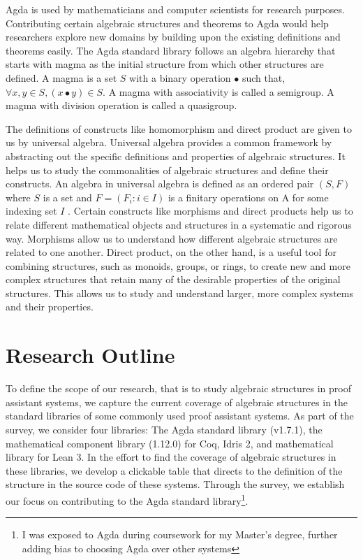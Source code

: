 Agda is used by mathematicians and computer scientists for research purposes.
Contributing certain algebraic structures and theorems to Agda would help
researchers explore new domains by building upon the existing definitions and
theorems easily. The Agda standard library follows an algebra hierarchy that
starts with magma as the initial structure from which other structures are
defined. A magma is a set $S$ with a binary operation $∙$ such that, $\forall
x,y \in S, (x ∙ y) \in S$. A magma with associativity is called a semigroup. A
magma with division operation is called a quasigroup.

The definitions of constructs like homomorphism and direct product are given to
us by universal algebra. Universal algebra provides a common framework by
abstracting out the specific definitions and properties of algebraic structures.
It helps us to study the commonalities of algebraic structures and define their
constructs. An algebra in universal algebra is defined as an ordered pair
$(S,F)$ where $S$ is a set and $F = (F_i:i\in I)$ is a finitary operations on A
for some indexing set $I$ \cite{sannella2012foundations}. Certain constructs
like morphisms and direct products help us to relate different mathematical
objects and structures in a systematic and rigorous way. Morphisms
allow us to understand how different algebraic structures are related to one
another. Direct product, on the other hand, is a useful tool for combining
structures, such as monoids, groups, or rings, to create new and more
complex structures that retain many of the desirable properties of the original
structures. This allows us to study and understand larger, more complex systems
and their properties.

\section{Research Outline}
To define the scope of our research, that is to study algebraic structures in
proof assistant systems, we capture the current coverage of algebraic structures
in the standard libraries of some commonly used proof assistant systems. As part
of the survey, we consider four libraries: The Agda standard library (v1.7.1),
the mathematical component library (1.12.0) for Coq, Idris 2, and mathematical
library for Lean 3. In the effort to find the coverage of algebraic
structures in these libraries, we develop a clickable table that directs to the
definition of the structure in the source code of these systems. Through the
survey, we establish our focus on contributing to the Agda standard
library\footnote{I was exposed to Agda during coursework for my Master's degree,
further adding bias to choosing Agda over other systems}.

